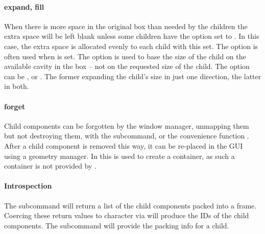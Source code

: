 \paragraph{expand, fill}
When there is more space in the original box than needed by the
children the extra space will be left blank unless some children have
the option  set to . In this case,
the extra space is allocated evenly to each child with this set. The
 option is often used when  is set.  The
 option is used to base the size of the child on
the available cavity in the box -- not on the requested size of the
child. The  option can be ,  or
. The former expanding the child's size in just one
direction, the latter in both.

\paragraph{forget}
Child components can be forgotten by the window manager, unmapping them but not destroying them, with the  subcommand, or the convenience function . After a child component is removed this way, it can be re-placed in the GUI using a geometry manager. In  this is used to create a  container, as such a container is not provided by \TK.

\paragraph{Introspection}
The subcommand  will return a list of the child components packed into a frame. Coercing these return values to character via  will produce the IDs of the child components. The subcommand  will provide the packing info for a child.

